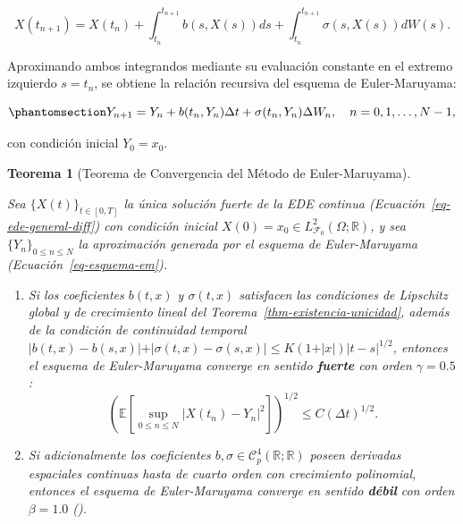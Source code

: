 \documentclass[
  spanish,
  letterpaper,
  DIV=11,
  numbers=noendperiod]{scrreprt}
\providecommand{\tightlist}{%
  \setlength{\itemsep}{0pt}\setlength{\parskip}{0pt}}
\theoremstyle{plain}
\theoremstyle{plain}
\newtheorem{theorem}{Teorema}[chapter]
\theoremstyle{plain}
\theoremstyle{definition}
\theoremstyle{remark}
\begin{document}
\[
X(t_{n+1}) = X(t_n) + \int_{t_n}^{t_{n+1}} b(s, X(s)) ds + \int_{t_n}^{t_{n+1}} \sigma(s, X(s)) dW(s).
\]

Aproximando ambos integrandos mediante su evaluación constante en el
extremo izquierdo \(s = t_n\), se obtiene la relación recursiva del
esquema de Euler-Maruyama:

\begin{equation}\phantomsection\label{eq-esquema-em}{
Y_{n+1} = Y_n + b(t_n, Y_n) \Delta t + \sigma(t_n, Y_n) \Delta W_n, \quad n = 0, 1, \dots, N - 1,
}\end{equation}

con condición inicial \(Y_0 = x_0\).

\begin{theorem}[Teorema de Convergencia del Método de
Euler-Maruyama]\protect\hypertarget{thm-euler-maruyama}{}\label{thm-euler-maruyama}

Sea \(\{X(t)\}_{t \in [0, T]}\) la única solución fuerte de la EDE
continua (Ecuación~\ref{eq-ede-general-diff}) con condición inicial
\(X(0) = x_0 \in L^2_{\mathcal{F}_0}(\Omega; \mathbb{R})\), y sea
\(\{Y_n\}_{0 \le n \le N}\) la aproximación generada por el esquema de
Euler-Maruyama (Ecuación~\ref{eq-esquema-em}).

\begin{enumerate}
\def\labelenumi{\arabic{enumi}.}
\tightlist
\item
  Si los coeficientes \(b(t, x)\) y \(\sigma(t, x)\) satisfacen las
  condiciones de Lipschitz global y de crecimiento lineal del
  Teorema~\ref{thm-existencia-unicidad}, además de la condición de
  continuidad temporal
  \(\vert b(t, x) - b(s, x) \vert + \vert \sigma(t, x) - \sigma(s, x) \vert \le K(1 + \vert x \vert)\vert t - s \vert^{1/2}\),
  entonces el esquema de Euler-Maruyama converge en sentido
  \textbf{fuerte} con orden \(\gamma = 0.5\): \[
  \left( \mathbb{E}\left[ \sup_{0 \le n \le N} \vert X(t_n) - Y_n \vert^2 \right] \right)^{1/2} \le C (\Delta t)^{1/2}.
  \]
\item
  Si adicionalmente los coeficientes
  \(b, \sigma \in \mathcal{C}_p^{4}(\mathbb{R}; \mathbb{R})\) poseen
  derivadas espaciales continuas hasta de cuarto orden con crecimiento
  polinomial, entonces el esquema de Euler-Maruyama converge en sentido
  \textbf{débil} con orden \(\beta = 1.0\)
  ().
\end{enumerate}

\end{theorem}
\end{document}
